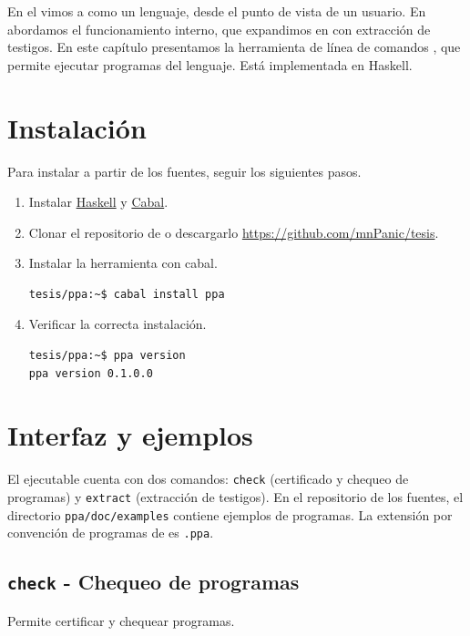 En el  vimos a \ppaLang{} como un lenguaje, desde el punto de
vista de un usuario. En  abordamos el funcionamiento
interno, que expandimos en  con extracción de
testigos. En este capítulo presentamos la herramienta de línea de comandos
\ppaTool{}, que permite ejecutar programas del lenguaje. Está implementada en Haskell.

\section{Instalación}

Para instalar \ppaTool{} a partir de los fuentes, seguir los siguientes pasos.

\begin{enumerate}
    \item Instalar \href{https://www.haskell.org/}{Haskell} y \href{https://www.haskell.org/cabal/}{Cabal}.
    \item Clonar el repositorio de \ppaTool{} o descargarlo \url{https://github.com/mnPanic/tesis}.
    \item Instalar la herramienta con cabal.
    \begin{verbatim}
tesis/ppa:~$ cabal install ppa
    \end{verbatim}
    \item Verificar la correcta instalación.
    \begin{verbatim}
tesis/ppa:~$ ppa version
ppa version 0.1.0.0
    \end{verbatim}
\end{enumerate}

\section{Interfaz y ejemplos}

El ejecutable \ppaTool{} cuenta con dos comandos: \texttt{check} (certificado y
chequeo de programas) y \texttt{extract} (extracción de testigos). En el
repositorio de los fuentes, el directorio \texttt{ppa/doc/examples} contiene
ejemplos de programas. La extensión por convención de programas de \ppaTool{} es \texttt{.ppa}.

\subsection{\texttt{check} - Chequeo de programas}

Permite certificar y chequear programas.

